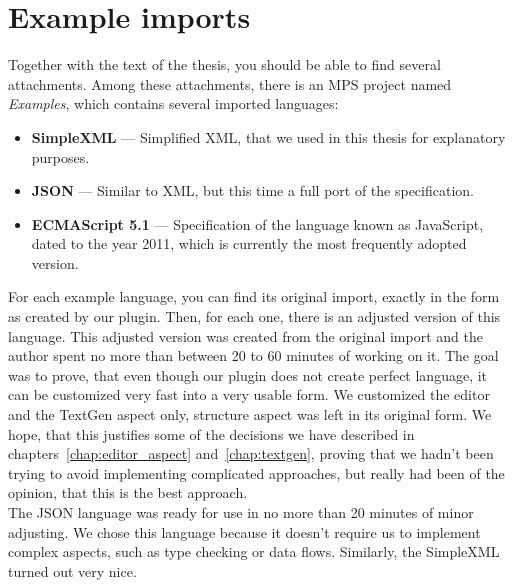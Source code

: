 \chapter{Example imports}
\label{chap:examples}

Together with the text of the thesis, you should be able to find several attachments.
Among these attachments, there is an MPS project named \textit{Examples}, which contains several imported languages:

\begin{itemize}
	\item \textbf{SimpleXML} --- Simplified XML, that we used in this thesis for explanatory purposes.
	
	\item \textbf{JSON} --- Similar to XML, but this time a full port of the specification.
	
	\item \textbf{ECMAScript 5.1} --- Specification of the language known as JavaScript, dated to the year 2011, which is currently the most frequently adopted version.
\end{itemize}

For each example language, you can find its original import, exactly in the form as created by our plugin.
Then, for each one, there is an adjusted version of this language.
This adjusted version was created from the original import and the author spent no more than between 20 to 60 minutes of working on it.
The goal was to prove, that even though our plugin does not create perfect language, it can be customized very fast into a very usable form.
We customized the editor and the TextGen aspect only, structure aspect was left in its original form.
We hope, that this justifies some of the decisions we have described in chapters~\ref{chap:editor_aspect} and~\ref{chap:textgen}, proving that we hadn't been trying to avoid implementing complicated approaches, but really had been of the opinion, that this is the best approach.
\\

The JSON language was ready for use in no more than 20 minutes of minor adjusting.
We chose this language because it doesn't require us to implement complex aspects, such as type checking or data flows.
Similarly, the SimpleXML turned out very nice.
\\

